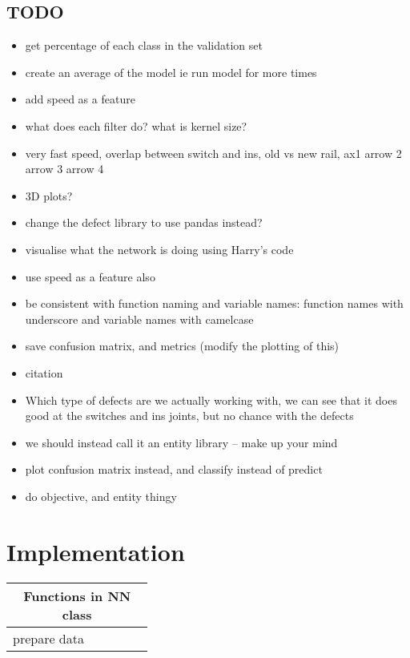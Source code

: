 \section{TODO}
\begin{itemize}
	\item get percentage of each class in the validation set
	\item create an average of the model ie run model for more times
	\item add speed as a feature
	\item what does each filter do? what is kernel size?
	\item very fast speed, overlap between switch and ins, old vs new rail, ax1 arrow 2 arrow 3 arrow 4
	\item 3D plots?
	\item change the defect library to use pandas instead?
	\item visualise what the network is doing using Harry's code
	\item use speed as a feature also
	\item be consistent with function naming and variable names: function names with underscore and variable names with camelcase
	\item save confusion matrix, and metrics (modify the plotting of this) \item citation \cite{benchmark}
	\item Which type of defects are we actually working with, we can see that it does good at the switches and ins joints, but no chance with the defects
	\item we should instead call it an entity library -- make up your mind
	\item plot confusion matrix instead, and classify instead of predict
	\item do objective, and entity thingy
	
\end{itemize}



\newpage
\cleardoublepage
\appendix
\chapter{Implementation}
\begin{table}[H]
	\centering
	\begin{tabular}{l p{0.35\linewidth}} \hline
	\multicolumn{2}{c}{{\large \textbf{Functions in NN class}}}
		\\ \hline  
		prepare data      &  \\ \hline
	\end{tabular}
\end{table}
